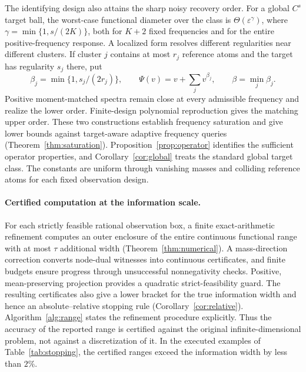 \documentclass[10pt]{amsart}
\theoremstyle{definition}
\theoremstyle{remark}
\theoremstyle{plain}
\newcommand{\eps}{\varepsilon}
\begin{document}
The identifying design also attains the sharp noisy recovery order. For a global $C^s$ target ball, the worst-case functional diameter over the class is $\Theta(\eps^\gamma)$, where $\gamma=\min\{1,s/(2K)\}$, both for $K+2$ fixed frequencies and for the entire positive-frequency response. A localized form resolves different regularities near different clusters. If cluster $j$ contains at most $r_j$ reference atoms and the target has regularity $s_j$ there, put
\begin{equation}\label{eq:rates-summary}
 \beta_j=\min\{1,s_j/(2r_j)\},\qquad
 \Psi(v)=v+\sum_jv^{\beta_j},\qquad \beta=\min_j\beta_j.
\end{equation}
Positive moment-matched spectra remain close at every admissible frequency and realize the lower order. Finite-design polynomial reproduction gives the matching upper order. These two constructions establish frequency saturation and give lower bounds against target-aware adaptive frequency queries (Theorem~\ref{thm:saturation}). Proposition~\ref{prop:operator} identifies the sufficient operator properties, and Corollary~\ref{cor:global} treats the standard global target class. The constants are uniform through vanishing masses and colliding reference atoms for each fixed observation design.

\paragraph{Certified computation at the information scale.}
For each strictly feasible rational observation box, a finite exact-arithmetic refinement computes an outer enclosure of the entire continuous functional range with at most $\tau$ additional width (Theorem~\ref{thm:numerical}). A mass-direction correction converts node-dual witnesses into continuous certificates, and finite budgets ensure progress through unsuccessful nonnegativity checks. Positive, mean-preserving projection provides a quadratic strict-feasibility guard. The resulting certificates also give a lower bracket for the true information width and hence an absolute--relative stopping rule (Corollary~\ref{cor:relative}). Algorithm~\ref{alg:range} states the refinement procedure explicitly. Thus the accuracy of the reported range is certified against the original infinite-dimensional problem, not against a discretization of it. In the executed examples of Table~\ref{tab:stopping}, the certified ranges exceed the information width by less than $2\%$.
\end{document}
